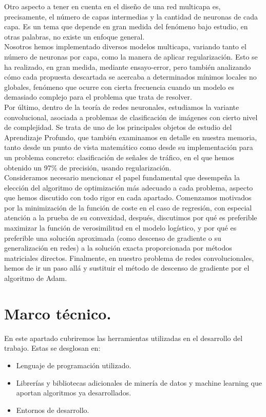 \documentclass[a4paper,11pt]{article}
\begin{document}
\noindent
Otro aspecto a tener en cuenta en el diseño de una red multicapa es, precisamente, el número de capas intermedias y la cantidad de neuronas de cada capa. Es un tema que depende en gran medida del fenómeno bajo estudio, en otras palabras, no existe un enfoque general.\\

\noindent
Nosotros hemos implementado diversos modelos multicapa, variando tanto el número de neuronas por capa, como la manera de aplicar regularización. Esto se ha realizado, en gran medida, mediante ensayo-error, pero también analizando cómo cada propuesta descartada se acercaba a determinados mínimos locales no globales, fenómeno que ocurre con cierta frecuencia cuando un modelo es demasiado complejo para el problema que trata de resolver. \\

\noindent
Por último, dentro de la teoría de redes neuronales, estudiamos la variante convolucional, asociada a problemas de clasificación de imágenes con cierto nivel de complejidad. Se trata de uno de los principales objetos de estudio del Aprendizaje Profundo, que también examinamos en detalle en nuestra memoria, tanto desde un punto de vista matemático como desde su implementación para un problema concreto: clasificación de señales de tráfico, en el que hemos obtenido un 97\%  de precisión, usando regularización.\\

\noindent
Consideramos necesario mencionar el papel fundamental que desempeña la elección del algoritmo de optimización más adecuado a cada problema, aspecto que hemos discutido con todo rigor en cada apartado. Comenzamos motivados por la minimización de la función de coste en el caso de regresión, con especial atención a la prueba de su convexidad, después, discutimos por qué es preferible maximizar la función de verosimilitud en el modelo logístico, y por qué es preferible una solución aproximada (como descenso de gradiente o su generalización en redes) a la solución exacta proporcionada por métodos matriciales directos. Finalmente, en nuestro problema de redes convolucionales, hemos de ir un paso allá y sustituir el método de descenso de gradiente por el algoritmo de Adam.\\

\newpage

\section{Marco técnico.}
En este apartado cubriremos las herramientas utilizadas en el desarrollo del trabajo. Estas se desglosan en:
\begin{itemize}
\item Lenguaje de programación utilizado.
\item Librerías y bibliotecas adicionales de minería de datos y machine learning que aportan algoritmos ya desarrollados.
\item Entornos  de desarrollo.
\end{itemize}
\end{document}
